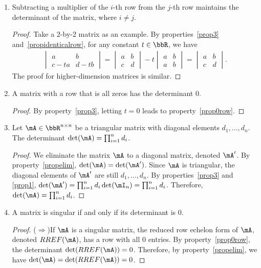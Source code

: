 \documentclass[11pt]{article}
\theoremstyle{plain}
\theoremstyle{definition}
\begin{document}
\begin{enumerate}
	\item \label{propelim} Subtracting a multiplier of the $i$-th row from the $j$-th row maintains the determinant of the matrix, where $i \neq j$.
	\begin{proof}
		Take a 2-by-2 matrix as an example. By properties~\ref{prop3} and~\ref{propidenticalrow}, for any constant $t \in \bbR$, we have 
	\begin{align}
		 \begin{vmatrix}
			a & b \\ c - ta&d -tb
		\end{vmatrix} = \begin{vmatrix}
			a & b \\ c &d
		\end{vmatrix} -t \begin{vmatrix}
			a & b \\ a& b
		\end{vmatrix}  = \begin{vmatrix}
			a & b \\ c &d
		\end{vmatrix}.
	\end{align}
	The proof for higher-dimension matrices is similar.
	\end{proof}
	
	\item\label{prop0row} A matrix with a row that is all zeros has the determinant 0.
	\begin{proof}
		By property~\ref{prop3}, letting $t = 0$ leads to property~\ref{prop0row}.
	\end{proof}

	
	\item\label{propdiag} Let $\mA \in \bbR^{n \times n}$ be a triangular matrix with diagonal elements $d_1,...,d_n$. The determinant $\det(\mA) = \prod_{i = 1}^n d_i$. 
	\begin{proof}
	We eliminate the matrix $\mA$ to a diagonal matrix, denoted $\mA'$. By property~\ref{propelim}, $\det(\mA) = \det(\mA')$. Since $\mA$ is triangular, the diagonal elements of $\mA'$ are still $d_1,...,d_n$.
 		 By properties~\ref{prop3} and \ref{prop1}, $\det(\mA') = \prod_{i = 1}^n d_i\det(\mI_n) =\prod_{i = 1}^n d_i$. Therefore, $\det(\mA) = \prod_{i = 1}^n d_i$.
	\end{proof}

	
	\item\label{propsingular} A matrix is singular if and only if its determinant is  0.
	
	\begin{proof}
		($\Rightarrow$)If $\mA$ is a singular matrix, the reduced row echelon form of $\mA$, denoted $RREF(\mA)$, has a row with all 0 entries. By property~\ref{prop0row}, the determinant $\det(RREF(\mA)) = 0$. Therefore, by property~\ref{propelim}, we have $\det(\mA) =\det(RREF(\mA)) =  0$. 
		

\end{proof}
\end{enumerate}
\end{document}
